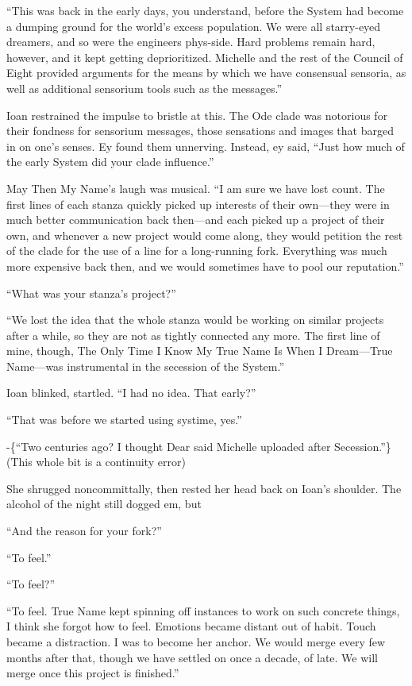 ``This was back in the early days, you understand, before the System had become a dumping ground for the world's excess population. We were all starry-eyed dreamers, and so were the engineers phys-side. Hard problems remain hard, however, and it kept getting deprioritized. Michelle and the rest of the Council of Eight provided arguments for the means by which we have consensual sensoria, as well as additional sensorium tools such as the messages.''

Ioan restrained the impulse to bristle at this. The Ode clade was notorious for their fondness for sensorium messages, those sensations and images that barged in on one's senses. Ey found them unnerving. Instead, ey said, ``Just how much of the early System did your clade influence.''

May Then My Name's laugh was musical. ``I am sure we have lost count. The first lines of each stanza quickly picked up interests of their own---they were in much better communication back then---and each picked up a project of their own, and whenever a new project would come along, they would petition the rest of the clade for the use of a line for a long-running fork. Everything was much more expensive back then, and we would sometimes have to pool our reputation.''

``What was your stanza's project?''

``We lost the idea that the whole stanza would be working on similar projects after a while, so they are not as tightly connected any more. The first line of mine, though, The Only Time I Know My True Name Is When I Dream---True Name---was instrumental in the secession of the System.''

Ioan blinked, startled. ``I had no idea. That early?''

``That was before we started using systime, yes.''

-\{``Two centuries ago? I thought Dear said Michelle uploaded after Secession.''\}(This whole bit is a continuity error)

She shrugged noncommittally, then rested her head back on Ioan's shoulder. The alcohol of the night still dogged em, but

``And the reason for your fork?''

``To feel.''

``To feel?''

``To feel. True Name kept spinning off instances to work on such concrete things, I think she forgot how to feel. Emotions became distant out of habit. Touch became a distraction. I was to become her anchor. We would merge every few months after that, though we have settled on once a decade, of late. We will merge once this project is finished.''

